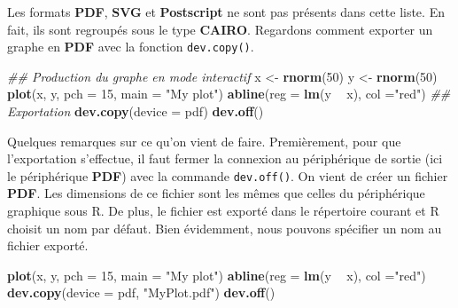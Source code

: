 \documentclass[]{article}
\newenvironment{Shaded}{\begin{snugshade}}{\end{snugshade}}
\newcommand{\CommentTok}[1]{\textcolor[rgb]{0.56,0.35,0.01}{\textit{#1}}}
\newcommand{\DataTypeTok}[1]{\textcolor[rgb]{0.13,0.29,0.53}{#1}}
\newcommand{\DecValTok}[1]{\textcolor[rgb]{0.00,0.00,0.81}{#1}}
\newcommand{\KeywordTok}[1]{\textcolor[rgb]{0.13,0.29,0.53}{\textbf{#1}}}
\newcommand{\NormalTok}[1]{#1}
\newcommand{\OperatorTok}[1]{\textcolor[rgb]{0.81,0.36,0.00}{\textbf{#1}}}
\newcommand{\StringTok}[1]{\textcolor[rgb]{0.31,0.60,0.02}{#1}}
\begin{document}
Les formats \textbf{PDF}, \textbf{SVG} et \textbf{Postscript} ne sont pas présents dans cette liste. En fait, ils sont regroupés sous le type \textbf{CAIRO}.
Regardons comment exporter un graphe en \textbf{PDF} avec la fonction \texttt{dev.copy()}.

\begin{Shaded}
\begin{Highlighting}[]
\CommentTok{## Production du graphe en mode interactif}
\NormalTok{x <-}\StringTok{ }\KeywordTok{rnorm}\NormalTok{(}\DecValTok{50}\NormalTok{)}
\NormalTok{y <-}\StringTok{ }\KeywordTok{rnorm}\NormalTok{(}\DecValTok{50}\NormalTok{)}
\KeywordTok{plot}\NormalTok{(x, y, }\DataTypeTok{pch =} \DecValTok{15}\NormalTok{, }\DataTypeTok{main =} \StringTok{"My plot"}\NormalTok{)}
\KeywordTok{abline}\NormalTok{(}\DataTypeTok{reg =} \KeywordTok{lm}\NormalTok{(y }\OperatorTok{~}\StringTok{ }\NormalTok{x), }\DataTypeTok{col  =}\StringTok{"red"}\NormalTok{)}
\CommentTok{## Exportation}
\KeywordTok{dev.copy}\NormalTok{(}\DataTypeTok{device =}\NormalTok{ pdf)}
\KeywordTok{dev.off}\NormalTok{()}
\end{Highlighting}
\end{Shaded}

Quelques remarques sur ce qu'on vient de faire. Premièrement, pour que l'exportation s'effectue, il faut fermer la connexion au périphérique de sortie (ici le périphérique \textbf{PDF}) avec la commande \texttt{dev.off()}. On vient de créer un fichier \textbf{PDF}. Les dimensions de ce fichier sont les mêmes que celles du périphérique graphique sous R. De plus, le fichier est exporté dans le répertoire courant et R choisit un nom par défaut. Bien évidemment, nous pouvons spécifier un nom au fichier exporté.

\begin{Shaded}
\begin{Highlighting}[]
\KeywordTok{plot}\NormalTok{(x, y, }\DataTypeTok{pch =} \DecValTok{15}\NormalTok{, }\DataTypeTok{main =} \StringTok{"My plot"}\NormalTok{)}
\KeywordTok{abline}\NormalTok{(}\DataTypeTok{reg =} \KeywordTok{lm}\NormalTok{(y }\OperatorTok{~}\StringTok{ }\NormalTok{x), }\DataTypeTok{col  =}\StringTok{"red"}\NormalTok{)}
\KeywordTok{dev.copy}\NormalTok{(}\DataTypeTok{device =}\NormalTok{ pdf, }\StringTok{"MyPlot.pdf"}\NormalTok{)}
\KeywordTok{dev.off}\NormalTok{()}
\end{Highlighting}
\end{Shaded}
\end{document}

